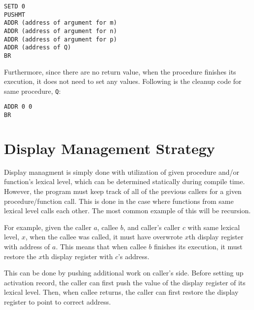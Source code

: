 \documentclass{article}
\begin{document}
\begin{lstlisting}
SETD 0
PUSHMT
ADDR (address of argument for m)
ADDR (address of argument for n)
ADDR (address of argument for p)
ADDR (address of Q)
BR
\end{lstlisting}

Furthermore, since there are no return value, when the procedure finishes its execution, it does not need to set any values. Following is the cleanup code for same procedure, {\tt Q}:

\begin{lstlisting}
ADDR 0 0
BR
\end{lstlisting}

\section{Display Management Strategy} \label{display}

Display managment is simply done with utilization of given procedure and/or function's lexical level, which can be determined statically during compile time. However, the program must keep track of all of the previous callers for a given procedure/function call. This is done in the case where functions from same lexical level calls each other. The most common example of this will be recursion.

For example, given the caller $a$, callee $b$, and caller's caller $c$ with same lexical level, $x$, when the callee was called, it must have overwrote $x$th display register with address of $a$. This means that when callee $b$ finishes its execution, it must restore the $x$th display register with $c$'s address.

This can be done by pushing additional work on caller's side. Before setting up activation record, the caller can first push the value of the display register of its lexical level. Then, when callee returns, the caller can first restore the display register to point to correct address.
\end{document}
